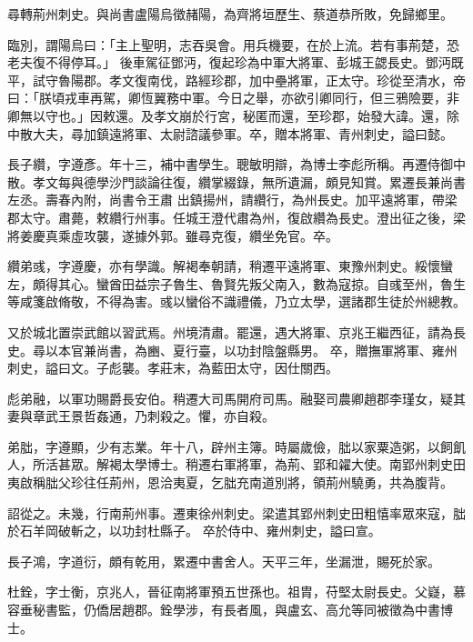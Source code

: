 \begin{pinyinscope}
 尋轉荊州刺史。與尚書盧陽烏徵赭陽，為齊將垣歷生、蔡道恭所敗，免歸鄉里。



 臨別，謂陽烏曰：「主上聖明，志吞吳會。用兵機要，在於上流。若有事荊楚，恐老夫復不得停耳。」
 後車駕征鄧沔，復起珍為中軍大將軍、彭城王勰長史。鄧沔既平，試守魯陽郡。孝文復南伐，路經珍郡，加中壘將軍，正太守。珍從至清水，帝曰：「朕頃戎車再駕，卿恆翼務中軍。今日之舉，亦欲引卿同行，但三鴉險要，非卿無以守也。」因敕還。及孝文崩於行宮，秘匿而還，至珍郡，始發大諱。還，除中散大夫，尋加鎮遠將軍、太尉諮議參軍。卒，贈本將軍、青州刺史，謚曰懿。



 長子纘，字遵彥。年十三，補中書學生。聰敏明辯，為博士李彪所稱。再遷侍御中散。孝文每與德學沙門談論往復，纘掌綴錄，無所遺漏，頗見知賞。累遷長兼尚書左丞。壽春內附，尚書令王肅
 出鎮揚州，請纘行，為州長史。加平遠將軍，帶梁郡太守。肅薨，敕纘行州事。任城王澄代肅為州，復啟纘為長史。澄出征之後，梁將姜慶真乘虛攻襲，遂據外郭。雖尋克復，纘坐免官。卒。



 纘弟彧，字遵慶，亦有學識。解褐奉朝請，稍遷平遠將軍、東豫州刺史。綏懷蠻左，頗得其心。蠻酋田益宗子魯生、魯賢先叛父南入，數為寇掠。自彧至州，魯生等咸箋啟脩敬，不得為害。彧以蠻俗不識禮儀，乃立太學，選諸郡生徒於州總教。



 又於城北置崇武館以習武焉。州境清肅。罷還，遇大將軍、京兆王繼西征，請為長史。尋以本官兼尚書，為豳、夏行臺，以功封陰盤縣男。
 卒，贈撫軍將軍、雍州刺史，謚曰文。子彪襲。孝莊末，為藍田太守，因仕關西。



 彪弟融，以軍功賜爵長安伯。稍遷大司馬開府司馬。融娶司農卿趙郡李瑾女，疑其妻與章武王景哲姦通，乃刺殺之。懼，亦自殺。



 弟朏，字遵顯，少有志業。年十八，辟州主簿。時屬歲儉，朏以家粟造粥，以飼飢人，所活甚眾。解褐太學博士。稍遷右軍將軍，為荊、郢和糴大使。南郢州刺史田夷啟稱朏父珍往任荊州，恩洽夷夏，乞朏充南道別將，領荊州驍勇，共為腹背。



 詔從之。未幾，行南荊州事。遷東徐州刺史。梁遣其郢州刺史田粗憘率眾來寇，朏於石羊岡破斬之，以功封杜縣子。
 卒於侍中、雍州刺史，謚曰宣。



 長子鴻，字道衍，頗有乾用，累遷中書舍人。天平三年，坐漏泄，賜死於家。



 杜銓，字士衡，京兆人，晉征南將軍預五世孫也。祖胄，苻堅太尉長史。父嶷，慕容垂秘書監，仍僑居趙郡。銓學涉，有長者風，與盧玄、高允等同被徵為中書博士。




\end{pinyinscope}
